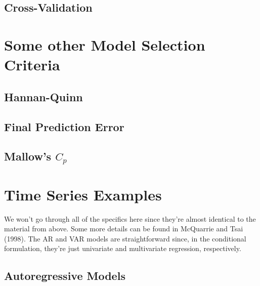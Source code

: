 \documentclass[12pt]{article}
\theoremstyle{definition}
\begin{document}
\subsection{Cross-Validation}


\section{Some other Model Selection Criteria}
\subsection{Hannan-Quinn}
\subsection{Final Prediction Error}
\subsection{Mallow's $C_p$}




\section{Time Series Examples}
We won't go through all of the specifics here since they're almost identical to the material from above. Some more details can be found in
McQuarrie and Tsai (1998). The AR and VAR models are straightforward since, in the conditional formulation, they're just univariate and multivariate regression, respectively.

\subsection{Autoregressive Models}
\end{document}
